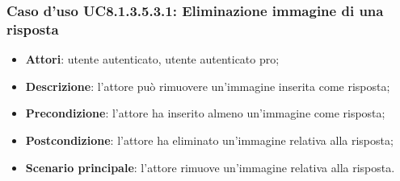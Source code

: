 \subsubsection{Caso d'uso UC8.1.3.5.3.1: Eliminazione immagine di una risposta}
\begin{itemize}
	\item\textbf{Attori}: utente autenticato, utente autenticato pro;
	\item\textbf{Descrizione}: l'attore può rimuovere un'immagine inserita come risposta;
	\item\textbf{Precondizione}: l'attore ha inserito almeno un'immagine come risposta; 
	\item \textbf{Postcondizione}: l'attore ha eliminato un'immagine relativa alla risposta;
	\item\textbf{Scenario principale}: l'attore rimuove un'immagine relativa alla risposta. 
\end{itemize}